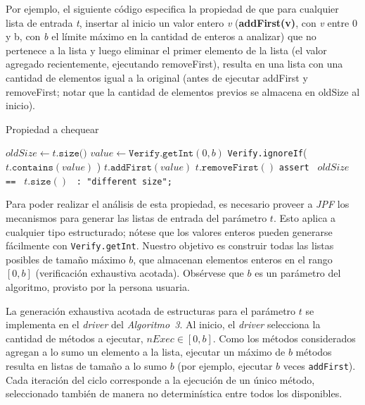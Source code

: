 

Por ejemplo, el siguiente código especifica la propiedad de que para cualquier lista de entrada \emph{t}, insertar al
inicio un valor entero \emph{v} (\textbf{addFirst(v)}, con \emph{v} entre 0 y b, con \emph{b} el límite máximo
en la cantidad de enteros a analizar) que no pertenece a la
lista y luego eliminar el primer elemento de la lista (el valor agregado recientemente, ejecutando removeFirst),
resulta en una lista con una cantidad de elementos igual a la original (antes de
ejecutar addFirst y removeFirst; notar que la cantidad de elementos previos
se almacena en oldSize al inicio).


\begin{algorithm}[H]
  \caption{Propiedad a chequear}
  \label{alg:propiedad-a-chequear}
  $oldSize \gets t.\texttt{size()}$\;
  $value \gets \texttt{Verify.getInt}(0, b)$\;
  \texttt{Verify.ignoreIf}( $t.\texttt{contains}(value)$ )\;
  $t.\texttt{addFirst}(value)$\;
  $t.\texttt{removeFirst}()$\;
  \texttt{assert } $oldSize$ \texttt{ == } $t.\texttt{size}()$ \texttt{ : "different size";}\;
\end{algorithm}




Para poder realizar el análisis de esta propiedad, es necesario proveer a
\emph{JPF} los mecanismos para generar las listas de entrada del parámetro
\(t\). Esto aplica a cualquier tipo estructurado; nótese que los valores
enteros pueden generarse fácilmente con \verb|Verify.getInt|. Nuestro
objetivo es construir todas las listas posibles de tamaño máximo \(b\), que
almacenan elementos enteros en el rango \([0,b]\) (verificación exhaustiva
acotada). Obsérvese que \(b\) es un parámetro del algoritmo, provisto por
la persona usuaria.

La generación exhaustiva acotada de estructuras para el parámetro \(t\) se
implementa en el \emph{driver} del \textit{Algoritmo~3}. Al inicio, el
\emph{driver} selecciona la cantidad de métodos a ejecutar,
\(nExec \in [0,b]\). Como los métodos considerados agregan a lo sumo un
elemento a la lista, ejecutar un máximo de \(b\) métodos resulta en listas de
tamaño a lo sumo \(b\) (por ejemplo, ejecutar \(b\) veces
\texttt{addFirst}). Cada iteración del ciclo corresponde a la ejecución de
un único método, seleccionado también de manera no determinística entre
todos los disponibles.

